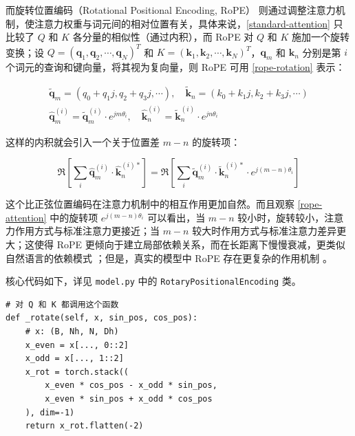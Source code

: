 \documentclass{ctexart}
\begin{document}
而旋转位置编码（Rotational Positional Encoding, RoPE）\cite{su2021rope} 则通过调整注意力机制，使注意力权重与词元间的相对位置有关，具体来说，\eqref{standard-attention} 只比较了 $Q$ 和 $K$ 各分量的相似性（通过内积），而 RoPE 对 $Q$ 和 $K$ 施加一个旋转变换；设 $Q = (\boldsymbol{q}_1, \boldsymbol{q}_2, \cdots, \boldsymbol{q}_N)^T$ 和 $K = (\boldsymbol{k}_1, \boldsymbol{k}_2, \cdots, \boldsymbol{k}_N)^T$，$\boldsymbol{q}_m$ 和 $\boldsymbol{k}_n$ 分别是第 $i$ 个词元的查询和键向量，将其视为复向量，则 RoPE 可用 \ref{rope-rotation} 表示：

\begin{gather}
\tilde{\boldsymbol{q}}_m = (q_0 + q_1 j, q_2 + q_3 j, \cdots), \quad \tilde{\boldsymbol{k}}_n = (k_0 + k_1 j, k_2 + k_3 j, \cdots) \label{complex-embedding} \\
\hat{\boldsymbol{q}}_m^{(i)} = \tilde{\boldsymbol{q}}_m^{(i)} \cdot e^{j m \theta_{i}}, \quad \hat{\boldsymbol{k}}_n^{(i)} = \tilde{\boldsymbol{k}}_n^{(i)} \cdot e^{j n\theta_{i}} \label{rope-rotation}
\end{gather}

这样的内积就会引入一个关于位置差 $m-n$ 的旋转项：

\begin{equation}
\Re\left[\sum_i\hat{\boldsymbol{q}}_m^{(i)} \cdot \hat{\boldsymbol{k}}_n^{(i)*}\right] = \Re\left[\sum_i\tilde{\boldsymbol{q}}_m^{(i)} \cdot \tilde{\boldsymbol{k}}_n^{(i)*} \cdot e^{j (m-n) \theta_{i}}\right] \label{rope-attention}
\end{equation}

这个比正弦位置编码在注意力机制中的相互作用更加自然。而且观察 \ref{rope-attention} 中的旋转项 $e^{j (m-n) \theta_{i}}$ 可以看出，当 $m-n$ 较小时，旋转较小，注意力作用方式与标准注意力更接近；当 $m-n$ 较大时作用方式与标准注意力差异更大；这使得 RoPE 更倾向于建立局部依赖关系，而在长距离下慢慢衰减，更类似自然语言的依赖模式 \cite{su2021rope}；但是，真实的模型中 RoPE 存在更复杂的作用机制 \cite{barbero2024rope}。

核心代码如下，详见 \verb|model.py| 中的 \verb|RotaryPositionalEncoding| 类。

\begin{verbatim}
# 对 Q 和 K 都调用这个函数
def _rotate(self, x, sin_pos, cos_pos):
    # x: (B, Nh, N, Dh)
    x_even = x[..., 0::2]
    x_odd = x[..., 1::2]
    x_rot = torch.stack((
        x_even * cos_pos - x_odd * sin_pos,
        x_even * sin_pos + x_odd * cos_pos
    ), dim=-1)
    return x_rot.flatten(-2)
\end{verbatim}
\end{document}
